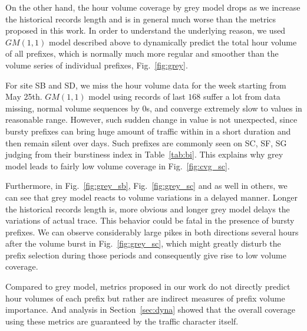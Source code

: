 On the other hand, the hour volume coverage by grey model drops as we increase the historical records length and is in general much worse than the metrics proposed in this work. 
In order to understand the underlying reason, we used $GM(1,1)$ model described above to dynamically predict the total hour volume of all prefixes, which is normally much more regular and smoother than the volume series of individual prefixes, Fig.~\ref{fig:grey}.

For site SB and SD, we miss the hour volume data for the week starting from May 25th. 
$GM(1,1)$ model using records of last $168$ suffer a lot from  data missing, normal volume sequences by 0s,  and converge extremely slow to values in reasonable range. 
However, such sudden change in value is not unexpected, since bursty prefixes can bring huge amount of traffic within in a short duration and then remain silent over days. Such prefixes are commonly seen on SC, SF, SG judging from their burstiness index in Table~\ref{tab:bi}.
This explains why grey model leads to fairly low volume coverage in Fig.~\ref{fig:cvg_sc}. 

Furthermore, in Fig.~\ref{fig:grey_sb}, Fig.~\ref{fig:grey_sc} and as well in others, we can see that grey model reacts to volume variations in a delayed manner. Longer the historical records length is, more obvious and longer grey model delays the variations of actual trace.  
This behavior could be fatal in the presence of bursty prefixes.
We can observe considerably large pikes in both directions several hours after the volume burst in Fig.~\ref{fig:grey_sc}, which might greatly disturb the prefix selection during those periods and consequently give rise to low volume coverage.

Compared to grey model, metrics proposed in our work do not directly predict hour volumes of each prefix but rather are indirect measures of prefix volume importance. And analysis in Section~\ref{sec:dyna} showed that the overall coverage using these metrics are guaranteed by the traffic character itself.


